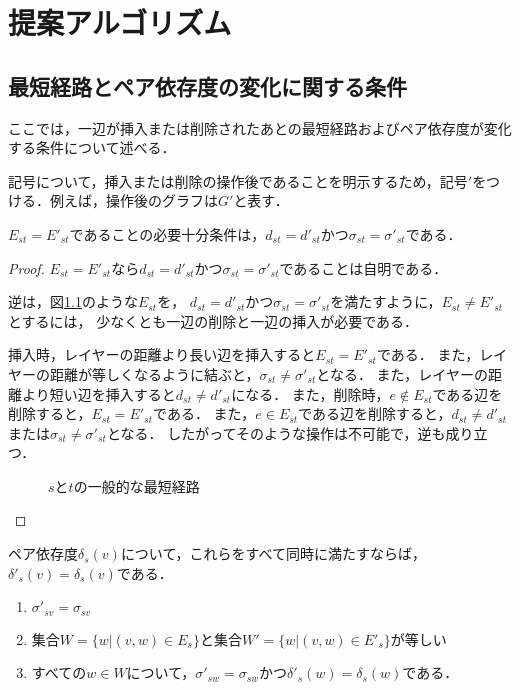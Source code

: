 \chapter{提案アルゴリズム}
\label{chap:algorithm}

\section{最短経路とペア依存度の変化に関する条件}
\label{sect:condition-of-variability}

ここでは，一辺が挿入または削除されたあとの最短経路およびペア依存度が変化する条件について述べる．

記号について，挿入または削除の操作後であることを明示するため，記号$'$をつける．例えば，操作後のグラフは$G'$と表す．

\begin{lemma}
  \label{lemma:condition-of-invariability-of-shortest-path}
  $E_{st}=E'_{st}$であることの必要十分条件は，$d_{st}=d'_{st}$かつ$\sigma_{st}=\sigma'_{st}$である．
\end{lemma}
\begin{proof}
  $E_{st}=E'_{st}$なら$d_{st}=d'_{st}$かつ$\sigma_{st}=\sigma'_{st}$であることは自明である．

  逆は，図\ref{fig:proof-invariability-of-paths}のような$E_{st}$を，
  $d_{st}=d'_{st}$かつ$\sigma_{st}=\sigma'_{st}$を満たすように，$E_{st}\neq E'_{st}$とするには，
  少なくとも一辺の削除と一辺の挿入が必要である．

  挿入時，レイヤーの距離より長い辺を挿入すると$E_{st}=E'_{st}$である．
  また，レイヤーの距離が等しくなるように結ぶと，$\sigma_{st}\neq\sigma'_{st}$となる．
  また，レイヤーの距離より短い辺を挿入すると$d_{st}\neq d'_{st}$になる．
  また，削除時，$e\notin E_{st}$である辺を削除すると，$E_{st}=E'_{st}$である．
  また，$e\in E_{st}$である辺を削除すると，$d_{st}\neq d'_{st}$または$\sigma_{st}\neq\sigma'_{st}$となる．
  したがってそのような操作は不可能で，逆も成り立つ．

  \begin{figure}
    \centering
    \def\svgwidth{.5\columnwidth}
    
    \caption{$s$と$t$の一般的な最短経路}
    \label{fig:proof-invariability-of-paths}
  \end{figure}
\end{proof}

\begin{lemma-without-proof}
  \label{lemma:condition-of-invariability-of-pairwise-dependency}
  ペア依存度$\delta_s(v)$について，これらをすべて同時に満たすならば，$\delta'_s(v)=\delta_s(v)$である．
  \begin{enumerate}
  \item $\sigma'_{sv}=\sigma_{sv}$
  \item 集合$W=\{w|(v,w)\in E_s\}$と集合$W'=\{w|(v,w)\in E'_s\}$が等しい
  \item すべての$w\in W$について，$\sigma'_{sw}=\sigma_{sw}$かつ$\delta'_s(w)=\delta_s(w)$である．
  \end{enumerate}
\end{lemma-without-proof}

